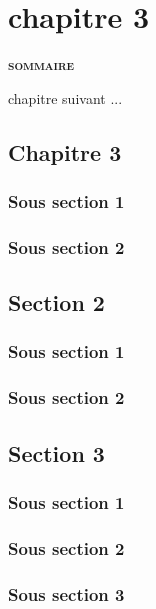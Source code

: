 \chapter{chapitre 3}
\label{chap:chap3}
\vspace{20pt}
\begin{center} {\scshape\bfseries sommaire} \end{center}
\startcontents[chapters]

\smash{\rule{\textwidth}{.4pt}}
\smash{\rule{\textwidth}{.4pt}}

\vspace{20pt}


 chapitre suivant ...


\section{Chapitre 3}

\subsection{Sous section 1}
\subsection{Sous section 2}

\section{Section 2}

\subsection{Sous section 1}
\subsection{Sous section 2}

\section{Section 3}

\subsection{Sous section 1}
\subsection{Sous section 2}
\subsection{Sous section 3}
